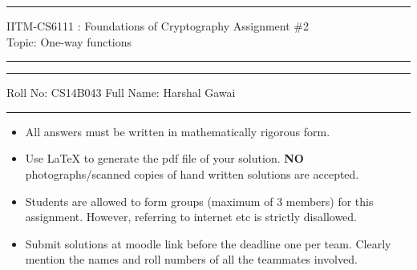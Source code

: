 \documentclass[11pt]{exam}
\begin{document}

\hrule
\vspace{3mm}
\noindent
{\sf IITM-CS6111 : Foundations of Cryptography  \hfill Assignment \#2 }
\vspace{3mm} \\
\noindent
{\sf Topic: One-way functions \hfill}
\vspace{3mm}
\hrule

\hrule
\vspace{3mm}
\noindent
{\sf Roll No: CS14B043 \hfill Full Name: Harshal Gawai}
\vspace{3mm}
\hrule

{\small 
\begin{itemize}
\itemsep 0pt
\item All answers must be written in mathematically rigorous form.
\item Use LaTeX to generate the pdf file of your solution. \textbf{NO} photographs/scanned copies of hand written solutions are accepted. 
\item Students are allowed to form groups (maximum of $3$ members) for this assignment. However, referring to internet etc is strictly disallowed.
\item Submit solutions at moodle link before the deadline one per team. Clearly mention the names and roll numbers of all the teammates involved.
\end{itemize}
}
\end{document}
